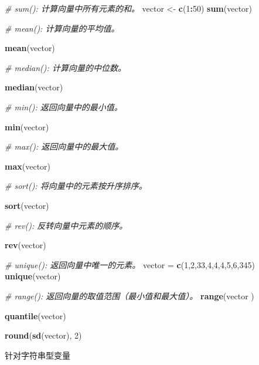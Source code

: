 \documentclass[]{book}
\newenvironment{Shaded}{\begin{snugshade}}{\end{snugshade}}
\newcommand{\CommentTok}[1]{\textcolor[rgb]{0.56,0.35,0.01}{\textit{#1}}}
\newcommand{\DecValTok}[1]{\textcolor[rgb]{0.00,0.00,0.81}{#1}}
\newcommand{\KeywordTok}[1]{\textcolor[rgb]{0.13,0.29,0.53}{\textbf{#1}}}
\newcommand{\NormalTok}[1]{#1}
\newcommand{\OperatorTok}[1]{\textcolor[rgb]{0.81,0.36,0.00}{\textbf{#1}}}
\newcommand{\StringTok}[1]{\textcolor[rgb]{0.31,0.60,0.02}{#1}}
\begin{document}
\begin{Shaded}
\begin{Highlighting}[]
\CommentTok{# sum(): 计算向量中所有元素的和。}
\NormalTok{vector <-}\StringTok{ }\KeywordTok{c}\NormalTok{(}\DecValTok{1}\OperatorTok{:}\DecValTok{50}\NormalTok{)}
\KeywordTok{sum}\NormalTok{(vector)}

\CommentTok{# mean(): 计算向量的平均值。}

\KeywordTok{mean}\NormalTok{(vector)}

\CommentTok{# median(): 计算向量的中位数。}

\KeywordTok{median}\NormalTok{(vector)}

\CommentTok{# min(): 返回向量中的最小值。}

\KeywordTok{min}\NormalTok{(vector)}

\CommentTok{# max(): 返回向量中的最大值。}

\KeywordTok{max}\NormalTok{(vector)}

\CommentTok{# sort(): 将向量中的元素按升序排序。}

\KeywordTok{sort}\NormalTok{(vector)}

\CommentTok{# rev(): 反转向量中元素的顺序。}

\KeywordTok{rev}\NormalTok{(vector)}

\CommentTok{# unique(): 返回向量中唯一的元素。}
\NormalTok{vector =}\StringTok{ }\KeywordTok{c}\NormalTok{(}\DecValTok{1}\NormalTok{,}\DecValTok{2}\NormalTok{,}\DecValTok{33}\NormalTok{,}\DecValTok{4}\NormalTok{,}\DecValTok{4}\NormalTok{,}\DecValTok{4}\NormalTok{,}\DecValTok{5}\NormalTok{,}\DecValTok{6}\NormalTok{,}\DecValTok{345}\NormalTok{)}
\KeywordTok{unique}\NormalTok{(vector)}

\CommentTok{# range(): 返回向量的取值范围（最小值和最大值）。}
\KeywordTok{range}\NormalTok{(vector )}

\KeywordTok{quantile}\NormalTok{(vector)}

\KeywordTok{round}\NormalTok{(}\KeywordTok{sd}\NormalTok{(vector), }\DecValTok{2}\NormalTok{)}
\end{Highlighting}
\end{Shaded}

针对字符串型变量
\end{document}
